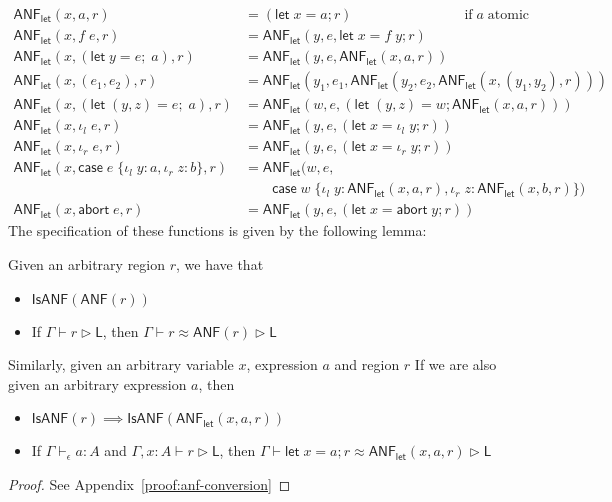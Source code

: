 \documentclass[acmsmall,screen,review]{acmart}
\newcommand{\ms}[1]{\ensuremath{\mathsf{#1}}}
\newcommand{\lto}{:}
\newcommand{\linl}[1]{\iota_l\;{#1}}
\newcommand{\linr}[1]{\iota_r\;{#1}}
\newcommand{\labort}[1]{\ms{abort}\;{#1}}
\newcommand{\letexpr}[3]{\ensuremath{\ms{let}\;#1 = #2;\;#3}}
\newcommand{\caseexpr}[5]{\ms{case}\;#1\;\{\linl{#2} \lto #3, \linr{#4} \lto #5\}}
\newcommand{\letstmt}[3]{\ensuremath{\ms{let}\;#1 = #2; #3}}
\newcommand{\casestmt}[5]{\ms{case}\;#1\;\{\linl{#2} \lto #3, \linr{#4} \lto #5\}}
\newcommand{\bhyp}[2]{#1 : #2}
\newcommand{\hasty}[4]{#1 \vdash_{#2} #3: {#4}}
\newcommand{\haslb}[3]{#1 \vdash #2 \rhd #3}
\newcommand{\teqv}{\approx}
\newcommand{\lbeq}[4]{#1 \vdash #2 \teqv #3 \rhd {#4}}
\newcommand{\toanf}[1]{\ms{ANF}(#1)}
\newcommand{\isanf}[1]{\ms{IsANF}(#1)}
\newcommand{\letanf}[3]{\ms{ANF}_{\ms{let}}(#1, #2, #3)}
\begin{document}
\begin{equation}
  \begin{aligned}
    \letanf{x}{a}{r} &= (\letstmt{x}{a}{r}) \hspace{8em} \text{if}\;a\;\text{atomic} \\
    \letanf{x}{f\;e}{r} &= \letanf{y}{e}{\letstmt{x}{f\;y}{r}} \\
    \letanf{x}{(\letexpr{y}{e}{a})}{r} &= \letanf{y}{e}{\letanf{x}{a}{r}} \\
    \letanf{x}{(e_1, e_2)}{r} &= \letanf{y_1}{e_1}{\letanf{y_2}{e_2}{\letanf{x}{(y_1,y_2)}{r}}} \\
    \letanf{x}{(\letexpr{(y, z)}{e}{a})}{r} 
      &= \letanf{w}{e}{(\letstmt{(y, z)}{w}{\letanf{x}{a}{r}})} \\
    \letanf{x}{\linl{e}}{r} &= \letanf{y}{e}{(\letstmt{x}{\linl{y}}{r})} \\
    \letanf{x}{\linr{e}}{r} &= \letanf{y}{e}{(\letstmt{x}{\linr{y}}{r})} \\
    \letanf{x}{\caseexpr{e}{y}{a}{z}{b}}{r} &= 
      \letanf{w}{e}{\\ & \qquad \casestmt{w}{y}{\letanf{x}{a}{r}}{z}{\letanf{x}{b}{r}}} \\
    \letanf{x}{\labort{e}}{r} &= \letanf{y}{e}{(\letstmt{x}{\labort{y}}{r})}
  \end{aligned}
\end{equation}
The specification of these functions is given by the following lemma:
\begin{lemma}[name=A-normalization, restate=anfconversion]
  Given an arbitrary region $r$, we have that
  \begin{itemize}
    \item $\isanf{\toanf{r}}$
    \item If $\haslb{\Gamma}{r}{\ms{L}}$, then $\lbeq{\Gamma}{r}{\ms{ANF}(r)}{\ms{L}}$
  \end{itemize}
  Similarly, given an arbitrary variable $x$, expression $a$ and region $r$
  If we are also given an arbitrary expression $a$, then
  \begin{itemize}
    \item $\isanf{r} \implies \isanf{\letanf{x}{a}{r}}$
    \item If $\hasty{\Gamma}{\epsilon}{a}{A}$ and $\haslb{\Gamma, \bhyp{x}{A}}{r}{\ms{L}}$, then
      $\lbeq{\Gamma}{\letstmt{x}{a}{r}}{\letanf{x}{a}{r}}{\ms{L}}$
  \end{itemize}
\end{lemma}
\begin{proof}
  See Appendix~\ref{proof:anf-conversion}
\end{proof}
\end{document}
